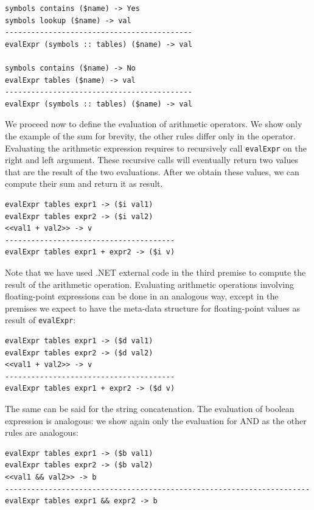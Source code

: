 \begin{lstlisting}
symbols contains ($name) -> Yes
symbols lookup ($name) -> val
-------------------------------------------
evalExpr (symbols :: tables) ($name) -> val

symbols contains ($name) -> No
evalExpr tables ($name) -> val
-------------------------------------------
evalExpr (symbols :: tables) ($name) -> val

\end{lstlisting}

We proceed now to define the evaluation of arithmetic operators. We show only the example of the sum for brevity, the other rules differ only in the operator. Evaluating the arithmetic expression requires to recursively call \texttt{evalExpr} on the right and left argument. These recursive calls will eventually return two values that are the result of the two evaluations. After we obtain these values, we can compute their sum and return it as result.

\begin{lstlisting}
evalExpr tables expr1 -> ($i val1)
evalExpr tables expr2 -> ($i val2)
<<val1 + val2>> -> v
---------------------------------------
evalExpr tables expr1 + expr2 -> ($i v)
\end{lstlisting}

\noindent
Note that we have used .NET external code in the third premise to compute the result of the arithmetic operation. Evaluating arithmetic operations involving floating-point expressions can be done in an analogous way, except in the premises we expect to have the meta-data structure for floating-point values as result of \texttt{evalExpr}:

\begin{lstlisting}
evalExpr tables expr1 -> ($d val1)
evalExpr tables expr2 -> ($d val2)
<<val1 + val2>> -> v
---------------------------------------
evalExpr tables expr1 + expr2 -> ($d v)
\end{lstlisting}

\noindent
The same can be said for the string concatenation.
The evaluation of boolean expression is analogous: we show again only the evaluation for AND as the other rules are analogous:

\begin{lstlisting}
evalExpr tables expr1 -> ($b val1)
evalExpr tables expr2 -> ($b val2)
<<val1 && val2>> -> b
----------------------------------------------------------------------
evalExpr tables expr1 && expr2 -> b
\end{lstlisting}

